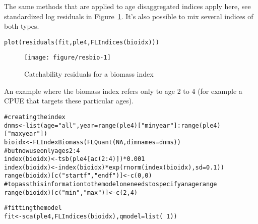 \documentclass[a4paper,english,10pt]{article}\usepackage[]{graphicx}\usepackage[]{color}
\makeatletter
\def\maxwidth{ %
  \ifdim\Gin@nat@width>\linewidth
    \linewidth
  \else
    \Gin@nat@width
  \fi
}
\newcommand{\hlnum}[1]{\textcolor[rgb]{0.2,0.2,0.2}{#1}}%
\newcommand{\hlstr}[1]{\textcolor[rgb]{0.2,0.2,0.2}{#1}}%
\newcommand{\hlcom}[1]{\textcolor[rgb]{0.2,0.267,0.4}{#1}}%
\newcommand{\hlopt}[1]{\textcolor[rgb]{0.2,0.2,0.2}{#1}}%
\newcommand{\hlstd}[1]{\textcolor[rgb]{0,0,0}{#1}}%
\newcommand{\hlkwb}[1]{\textcolor[rgb]{0.361,0.506,0.596}{#1}}%
\newcommand{\hlkwc}[1]{\textcolor[rgb]{0.361,0.506,0.596}{#1}}%
\newcommand{\hlkwd}[1]{\textcolor[rgb]{0.361,0.506,0.596}{#1}}%
\newenvironment{kframe}{%
 \def\at@end@of@kframe{}%
 \ifinner\ifhmode%
  \def\at@end@of@kframe{\end{minipage}}%
  \begin{minipage}{\columnwidth}%
 \fi\fi%
 \def\FrameCommand##1{\hskip\@totalleftmargin \hskip-\fboxsep
 \colorbox{shadecolor}{##1}\hskip-\fboxsep
     \hskip-\linewidth \hskip-\@totalleftmargin \hskip\columnwidth}%
 \MakeFramed {\advance\hsize-\width
   \@totalleftmargin\z@ \linewidth\hsize
   \@setminipage}}%
 {\par\unskip\endMakeFramed%
 \at@end@of@kframe}
\newenvironment{knitrout}{}{} %
\makeatother
\begin{document}
The same methods that are applied to age disaggregated indices apply here, see standardized log residuals in Figure~\ref{fig:resbio}. It's also possible to mix several indices of both types.

\begin{knitrout}
\color{fgcolor}\begin{kframe}
\begin{alltt}
\hlkwd{plot}\hlstd{(}\hlkwd{residuals}\hlstd{(fit, ple4,} \hlkwd{FLIndices}\hlstd{(bioidx)))}
\end{alltt}
\end{kframe}\begin{figure}[H]

{\centering \texttt{[image: figure/resbio-1]} 

}

\caption[Catchability residuals for a biomass index]{Catchability residuals for a biomass index\label{fig:resbio}}
\end{figure}


\end{knitrout}

An example where the biomass index refers only to age 2 to 4 (for example a CPUE that targets these particular ages).

\begin{knitrout}
\color{fgcolor}\begin{kframe}
\begin{alltt}
\hlcom{# creating the index}
\hlstd{dnms} \hlkwb{<-} \hlkwd{list}\hlstd{(}\hlkwc{age}\hlstd{=}\hlstr{"all"}\hlstd{,} \hlkwc{year}\hlstd{=}\hlkwd{range}\hlstd{(ple4)[}\hlstr{"minyear"}\hlstd{]}\hlopt{:}\hlkwd{range}\hlstd{(ple4)[}\hlstr{"maxyear"}\hlstd{])}
\hlstd{bioidx} \hlkwb{<-} \hlkwd{FLIndexBiomass}\hlstd{(}\hlkwd{FLQuant}\hlstd{(}\hlnum{NA}\hlstd{,} \hlkwc{dimnames}\hlstd{=dnms))}
\hlcom{# but now use only ages 2:4}
\hlkwd{index}\hlstd{(bioidx)} \hlkwb{<-} \hlkwd{tsb}\hlstd{(ple4[}\hlkwd{ac}\hlstd{(}\hlnum{2}\hlopt{:}\hlnum{4}\hlstd{)])}\hlopt{*}\hlnum{0.001}
\hlkwd{index}\hlstd{(bioidx)} \hlkwb{<-} \hlkwd{index}\hlstd{(bioidx)}\hlopt{*}\hlkwd{exp}\hlstd{(}\hlkwd{rnorm}\hlstd{(}\hlkwd{index}\hlstd{(bioidx),} \hlkwc{sd}\hlstd{=}\hlnum{0.1}\hlstd{))}
\hlkwd{range}\hlstd{(bioidx)[}\hlkwd{c}\hlstd{(}\hlstr{"startf"}\hlstd{,}\hlstr{"endf"}\hlstd{)]} \hlkwb{<-} \hlkwd{c}\hlstd{(}\hlnum{0}\hlstd{,}\hlnum{0}\hlstd{)}
\hlcom{# to pass this information to the model one needs to specify an age range}
\hlkwd{range}\hlstd{(bioidx)[}\hlkwd{c}\hlstd{(}\hlstr{"min"}\hlstd{,}\hlstr{"max"}\hlstd{)]} \hlkwb{<-} \hlkwd{c}\hlstd{(}\hlnum{2}\hlstd{,}\hlnum{4}\hlstd{)}

\hlcom{# fitting the model}
\hlstd{fit} \hlkwb{<-} \hlkwd{sca}\hlstd{(ple4,} \hlkwd{FLIndices}\hlstd{(bioidx),} \hlkwc{qmodel}\hlstd{=}\hlkwd{list}\hlstd{(}\hlopt{~}\hlnum{1}\hlstd{))}
\end{alltt}
\end{kframe}
\end{knitrout}
\end{document}
